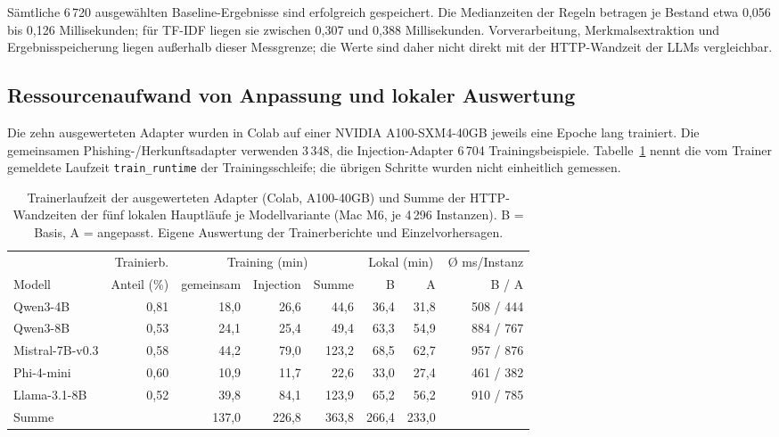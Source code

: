 \documentclass[12pt,twoside=false,a4paper,parskip]{scrbook}
\begin{document}
Sämtliche 6\,720 ausgewählten Baseline-Ergebnisse sind erfolgreich gespeichert. Die Medianzeiten der Regeln betragen je Bestand etwa 0{,}056 bis 0{,}126 Millisekunden; für TF-IDF liegen sie zwischen 0{,}307 und 0{,}388 Millisekunden. Vorverarbeitung, Merkmalsextraktion und Ergebnisspeicherung liegen außerhalb dieser Messgrenze; die Werte sind daher nicht direkt mit der HTTP-Wandzeit der LLMs vergleichbar.

\subsection{Ressourcenaufwand von Anpassung und lokaler Auswertung}\label{sec:ressourcenaufwand}

Die zehn ausgewerteten Adapter wurden in Colab auf einer NVIDIA A100-SXM4-40GB jeweils eine Epoche lang trainiert. Die gemeinsamen Phishing-/Herkunftsadapter verwenden 3\,348, die Injection-Adapter 6\,704 Trainingsbeispiele. Tabelle~\ref{tab:ressourcenaufwand} nennt die vom Trainer gemeldete Laufzeit \texttt{train\_runtime} der Trainingsschleife; die übrigen Schritte wurden nicht einheitlich gemessen.

\begin{table}[htbp]
\centering\small
\setlength{\tabcolsep}{4pt}
\caption{Trainerlaufzeit der ausgewerteten Adapter (Colab, A100-40GB) und Summe der HTTP-Wandzeiten der fünf lokalen Hauptläufe je Modellvariante (Mac M6, je 4\,296 Instanzen). B = Basis, A = angepasst. Eigene Auswertung der Trainerberichte und Einzelvorhersagen.}
\label{tab:ressourcenaufwand}
\begin{tabular}{lrrrrrrr}
\toprule
 & Trainierb. & \multicolumn{3}{c}{Training (min)} & \multicolumn{2}{c}{Lokal (min)} & Ø ms/Instanz \\
\cmidrule(lr){3-5}\cmidrule(lr){6-7}
Modell & Anteil (\%) & gemeinsam & Injection & Summe & B & A & B / A \\
\midrule
Qwen3-4B & 0{,}81 & 18{,}0 & 26{,}6 & 44{,}6 & 36{,}4 & 31{,}8 & 508 / 444 \\
Qwen3-8B & 0{,}53 & 24{,}1 & 25{,}4 & 49{,}4 & 63{,}3 & 54{,}9 & 884 / 767 \\
Mistral-7B-v0.3 & 0{,}58 & 44{,}2 & 79{,}0 & 123{,}2 & 68{,}5 & 62{,}7 & 957 / 876 \\
Phi-4-mini & 0{,}60 & 10{,}9 & 11{,}7 & 22{,}6 & 33{,}0 & 27{,}4 & 461 / 382 \\
Llama-3.1-8B & 0{,}52 & 39{,}8 & 84{,}1 & 123{,}9 & 65{,}2 & 56{,}2 & 910 / 785 \\
\midrule
Summe & & 137{,}0 & 226{,}8 & 363{,}8 & 266{,}4 & 233{,}0 & \\
\bottomrule
\end{tabular}
\end{table}
\end{document}
